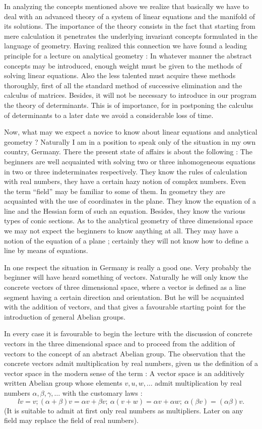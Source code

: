In analyzing the concepts mentioned above we realize that basically we
have to deal with an advanced theory of a system of linear equations
and the manifold of its solutions. The importance of the theory
consists in the fact that starting from mere calculation it penetrates
the underlying invariant concepts formulated in the language of
geometry. Having realized this connection we have found a leading
principle for a lecture on analytical geometry : In whatever manner
the abstract concepts may be introduced, enough weight must be given
to the methods of solving linear equations. Also the less talented
must acquire these methods thoroughly, first of all the standard
method of successive elimination and the calculus of
matrices. Besides, it will not be necessary to introduce in our
program the theory of determinants. This is of importance, for in
postponing the calculus of determinants to a later date we avoid a
considerable loss of time. 

Now, what may we expect a novice to know about linear equations and
analytical geometry ? Naturally I am in a position to speak only of
the situation in my own country, Germany. There the present state of
affairs is about the following : The beginners are well acquainted
with solving two or three inhomogeneous equations in two or three
indeterminates  respectively. They know the rules of calculation with
real numbers, they have a certain hazy notion of complex numbers. Even
the term ``field'' may be familiar to some of them. In geometry they
are acquainted with the use of coordinates in the plane. They know the
equation of a line and the Hessian form of such an equation. Besides,
they know the various types of conic sections. As to the analytical
geometry of three dimensional space we may not expect the beginners to
know anything at all. They may have a notion of the equation of a
plane ; certainly they will not know how to define a line by means of equations.

In one respect the situation in Germany is really a good one. Very
probably the beginner will have heard something of vectors. Naturally\pageoriginale
he will only know the concrete vectors of three dimensional space,
where a vector is defined as a line segment having a certain direction
and orientation. But he will be acquainted with  the addition of
vectors, and that gives a favourable starting point for the
introduction of general Abelian groups. 

In every case it is favourable to begin the lecture with the
discussion of concrete vectors in the three dimensional space and to
proceed from the addition of vectors to the concept of an abstract
Abelian group. The observation that the concrete vectors admit
multiplication by real numbers, given us the definition of a vector
space in the modern sense of the term : A vector space is an
additively written Abelian group whose elements $v, u, w, \ldots$
admit multiplication by real numbers $\alpha,\beta,\gamma, \ldots$
with the customary laws :
$$
lv = v ; (\alpha + \beta) v = \alpha v + \beta v ; ~ \alpha (v + w) =
\alpha v + \alpha w; ~ \alpha (\beta v) = (\alpha \beta) v.
$$
(It is suitable to admit at first only real numbers as
multipliers. Later on any field may replace the field of real numbers).

